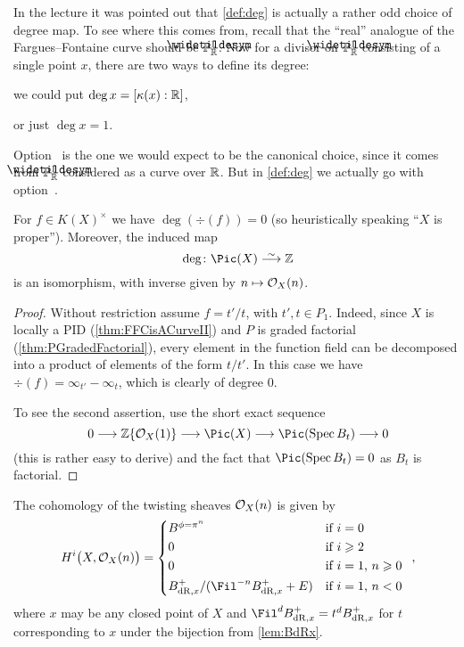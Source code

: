 \documentclass[a4paper, 10pt, oneside, DIV=9, chapterprefix=true, numbers=enddot,bibliography=totoc]{scrbook}
\begin{document}
\begin{rem}
	In the lecture it was pointed out that \cref{def:deg} is actually a rather odd choice of degree map. To see where this comes from, recall that the \enquote{real} analogue of the Fargues--Fontaine curve should be $\snake{\IP}_{\IR}^1$. Now for a divisor on $\snake{\IP}_{\IR}^1$ consisting of a single point $x$, there are two ways to define its degree:
	\begin{numerate}
		\item we could put $\deg x=[\kappa(x):\mathbb{R}]$,
		\item or just $\deg x=1$.
	\end{numerate}
	Option~ is the one we would expect to be the canonical choice, since it comes from $\snake{\IP}_{\IR}^1$ considered as a curve over $\mathbb{R}$. But in \cref{def:deg} we actually go with option~.
\end{rem}
\begin{prop}
	For $f\in K(X)^\times$ we have $\deg(\div(f))=0$ (so heuristically speaking \enquote{$X$ is proper}). Moreover, the induced map
	\begin{equation*}
		\deg\colon \Pic(X)\isomorphism \IZ
	\end{equation*}
	is an isomorphism, with inverse given by $n\mapsto \mathcal{O}_X(n)$.
\end{prop}
\begin{proof}
	Without restriction assume $f=t'/t$, with $t',t\in P_1$. Indeed, since $X$ is locally a PID (\cref{thm:FFCisACurveII}) and $P$ is graded factorial (\cref{thm:PGradedFactorial}), every element in the function field can be decomposed into a product of elements of the form $t/t'$. In this case we have $\div(f)=\infty_{t'}-\infty_t$, which is clearly of degree $0$.
	
	To see the second assertion, use the short exact sequence
	\begin{equation*}
		0\morphism \IZ\{\Oo_X(1)\}\morphism \Pic(X)\morphism \Pic(\Spec B_t)\morphism 0
	\end{equation*}
	(this is rather easy to derive) and the fact that $\Pic(\Spec B_t)=0$ as $B_t$ is factorial.
\end{proof}
\begin{prop}
	The cohomology of the twisting sheaves $\mathcal{O}_X(n)$ is given by
	\begin{equation*}
		H^i\big(X,\Oo_X(n)\big)=\begin{cases*}
		B^{\phi=\pi^n} & if $i=0$\\
		0 & if $i\geq 2$\\
		0 & if $i=1$, $n\geq 0$\\
		B_{\dR,x}^+/(\Fil^{-n}B_{\dR,x}^++E) & if $i=1$, $n<0$
		\end{cases*}\,,
	\end{equation*}
	where $x$ may be any closed point of $X$ and $\Fil^dB_{\dR,x}^+=t^dB_{\dR,x}^+$ for $t$ corresponding to $x$ under the bijection from \cref{lem:BdRx}.
\end{prop}
\end{document}
